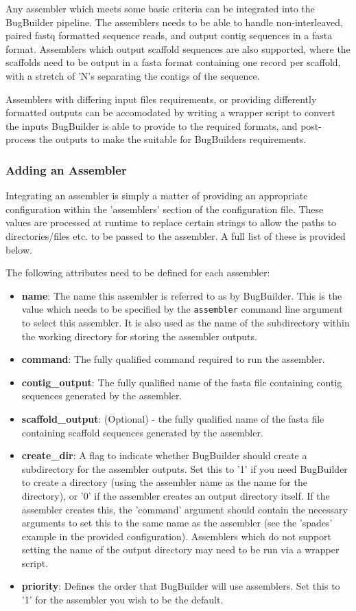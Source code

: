 \documentclass[a4paper,twoside,10pt]{article}
\begin{document}
Any assembler which meets some basic criteria can be integrated into the BugBuilder pipeline. The
assemblers needs to be able to handle non-interleaved, paired fastq formatted sequence reads, and
output contig sequences in a fasta format. Assemblers which output scaffold sequences are also
supported, where the scaffolds need to be output in a fasta format containing one record per
scaffold, with a stretch of 'N's separating  the contigs of the sequence. 

Assemblers with differing input files requirements, or providing differently formatted
outputs can be accomodated by writing a wrapper script to convert the inputs BugBuilder is able to
provide to the required formats, and post-process the outputs to make the suitable for BugBuilders
requirements.

\subsubsection{Adding an Assembler}

Integrating an assembler is simply a matter of providing an appropriate configuration within the
'assemblers' section of the configuration file. These values are processed at runtime to replace
certain strings to allow the paths to directories/files etc. to be passed to the assembler. A full
list of these is provided below. 

The following attributes need to be defined for each assembler:

\begin{itemize}
\item {\bf name}: The name this assembler is referred to as by BugBuilder. This is the value which
needs to be specified by the {\tt assembler} command line argument to select this assembler. It is
also used as the name of the subdirectory within the working directory for storing the assembler
outputs.
\item {\bf command}: The fully qualified command required to run the assembler. 
\item {\bf contig\_output}: The fully qualified name of the fasta file containing contig sequences
generated by the assembler.
\item {\bf scaffold\_output}: (Optional) - the fully qualified name of the fasta file containing
scaffold sequences generated by the assembler.
\item {\bf create\_dir}: A flag to indicate whether BugBuilder should create a subdirectory for the
assembler outputs. Set this to '1' if you need BugBuilder to create a directory (using the
assembler name as the name for the directory), or '0' if the assembler creates an output
directory itself. If the assembler creates this, the 'command' argument should contain the
necessary arguments to set this to the same name  as the assembler (see the 'spades' example in the
provided configuration). Assemblers which do not support setting the name of the output directory
may need to be run via a wrapper script.
\item {\bf priority}: Defines the order that BugBuilder will use assemblers. Set this to '1' for
the assembler you wish to be the default.
\end{itemize}
\end{document}
